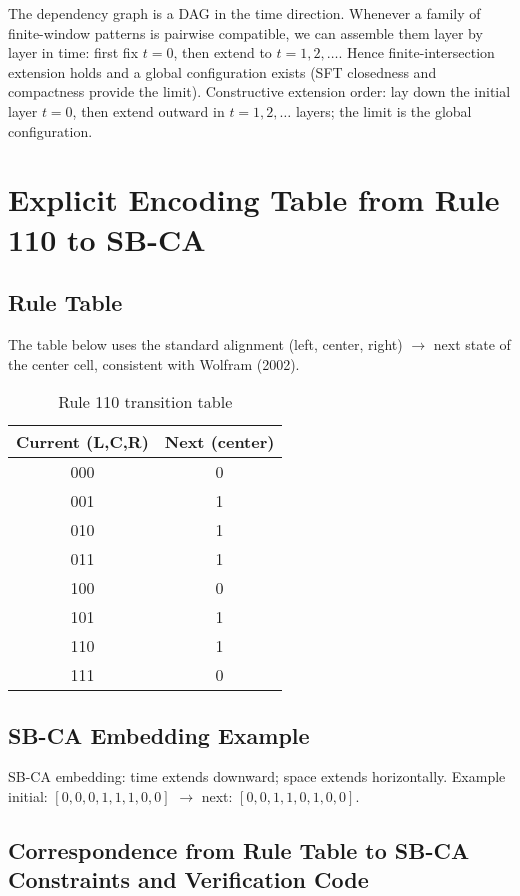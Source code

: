 \documentclass[12pt]{article}
\theoremstyle{plain}
\theoremstyle{definition}
\begin{document}
The dependency graph is a DAG in the time direction. Whenever a family of finite-window patterns is pairwise compatible, we can assemble them layer by layer in time: first fix $t=0$, then extend to $t=1,2,\dots$. Hence finite-intersection extension holds and a global configuration exists (SFT closedness and compactness provide the limit). Constructive extension order: lay down the initial layer $t=0$, then extend outward in $t=1,2,\dots$ layers; the limit is the global configuration.

\section{Explicit Encoding Table from Rule 110 to SB-CA}

\subsection{Rule Table}

The table below uses the standard alignment (left, center, right) $\to$ next state of the center cell, consistent with Wolfram (2002)\cite{wolfram2002}.

\begin{table}[h]
\centering
\caption{Rule 110 transition table}
\begin{tabular}{@{}cc@{}}
\toprule
Current (L,C,R) & Next (center) \\
\midrule
000 & 0 \\
001 & 1 \\
010 & 1 \\
011 & 1 \\
100 & 0 \\
101 & 1 \\
110 & 1 \\
111 & 0 \\
\bottomrule
\end{tabular}
\end{table}

\subsection{SB-CA Embedding Example}

SB-CA embedding: time extends downward; space extends horizontally. Example initial: $[0,0,0,1,1,1,0,0]$ $\to$ next: $[0,0,1,1,0,1,0,0]$.

\subsection{Correspondence from Rule Table to SB-CA Constraints and Verification Code}
\end{document}

